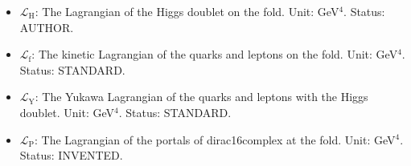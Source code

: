 \documentclass[
  10pt,
]{article}
\begin{document}
\begin{itemize}
  in the state of the medium (the vacuum, a plasma, the Kohn-Sham
  state). Status: STANDARD.
\item
  \(\mathcal{L}_{\mathrm{H}}\): The Lagrangian of the Higgs doublet on
  the fold. Unit: GeV\(^4\). Status: AUTHOR.
\item
  \(\mathcal{L}_{\mathrm{f}}\): The kinetic Lagrangian of the quarks and
  leptons on the fold. Unit: GeV\(^4\). Status: STANDARD.
\item
  \(\mathcal{L}_{\mathrm{Y}}\): The Yukawa Lagrangian of the quarks and
  leptons with the Higgs doublet. Unit: GeV\(^4\). Status: STANDARD.
\item
  \(\mathcal{L}_{\mathrm{P}}\): The Lagrangian of the portals of
  dirac16complex at the fold. Unit: GeV\(^4\). Status: INVENTED.
\end{itemize}
\end{document}
